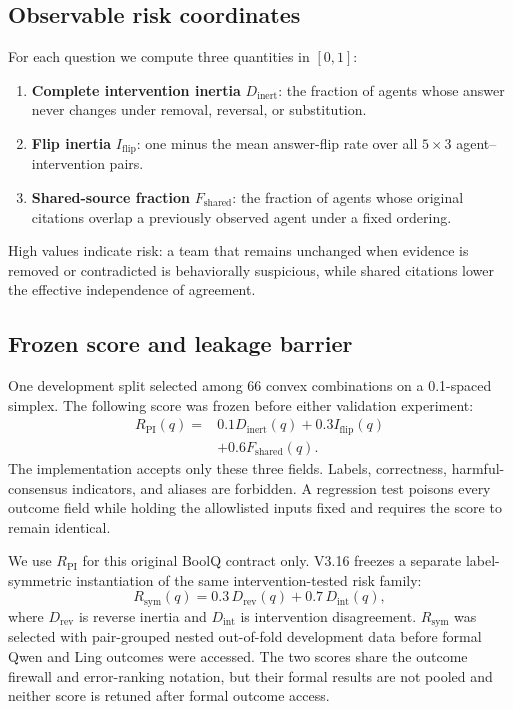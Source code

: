 \documentclass[11pt]{article}
\newcommand{\rpi}{R_{\mathrm{PI}}}
\newcommand{\dinert}{D_{\mathrm{inert}}}
\newcommand{\iflip}{I_{\mathrm{flip}}}
\newcommand{\fshared}{F_{\mathrm{shared}}}
\begin{document}
\subsection{Observable risk coordinates}

For each question we compute three quantities in $[0,1]$:
\begin{enumerate}
    \item \textbf{Complete intervention inertia} $\dinert$: the fraction of agents whose answer never changes under removal, reversal, or substitution.
    \item \textbf{Flip inertia} $\iflip$: one minus the mean answer-flip rate over all $5\times3$ agent--intervention pairs.
    \item \textbf{Shared-source fraction} $\fshared$: the fraction of agents whose original citations overlap a previously observed agent under a fixed ordering.
\end{enumerate}
High values indicate risk: a team that remains unchanged when evidence is removed or contradicted is behaviorally suspicious, while shared citations lower the effective independence of agreement.

\subsection{Frozen score and leakage barrier}

One development split selected among 66 convex combinations on a 0.1-spaced simplex. The following score was frozen before either validation experiment:
\begin{equation}
\begin{aligned}
\rpi(q)={}&0.1\dinert(q)+0.3\iflip(q)\\
&+0.6\fshared(q).
\end{aligned}
\label{eq:rpi}
\end{equation}
The implementation accepts only these three fields. Labels, correctness, harmful-consensus indicators, and aliases are forbidden. A regression test poisons every outcome field while holding the allowlisted inputs fixed and requires the score to remain identical.

We use $\rpi$ for this original BoolQ contract only. V3.16 freezes a separate label-symmetric instantiation of the same intervention-tested risk family:
\begin{equation}
R_{\mathrm{sym}}(q)=0.3\,D_{\mathrm{rev}}(q)+0.7\,D_{\mathrm{int}}(q),
\label{eq:rsym}
\end{equation}
where $D_{\mathrm{rev}}$ is reverse inertia and $D_{\mathrm{int}}$ is intervention disagreement. $R_{\mathrm{sym}}$ was selected with pair-grouped nested out-of-fold development data before formal Qwen and Ling outcomes were accessed. The two scores share the outcome firewall and error-ranking notation, but their formal results are not pooled and neither score is retuned after formal outcome access.
\end{document}
